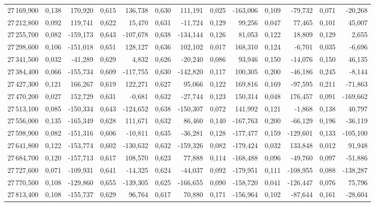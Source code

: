 \begin{longtable}{rrrrrrrrrrrrr}
27\,169,900 & 0,138 & 170,920 & 0,615 & 136,738 & 0,630 & 111,191 & 0,025 & -163,006 & 0,109 & -79,732 & 0,071 & -20,268\\
27\,212,800 & 0,092 & 119,741 & 0,622 & 15,470 & 0,631 & -11,724 & 0,129 & 99,256 & 0,047 & 77,465 & 0,101 & 45,007\\
27\,255,700 & 0,082 & -159,173 & 0,643 & -107,678 & 0,638 & -134,144 & 0,126 & 81,053 & 0,122 & 18,809 & 0,129 & 2,655\\
27\,298,600 & 0,106 & -151,018 & 0,651 & 128,127 & 0,636 & 102,102 & 0,017 & 168,310 & 0,124 & -6,701 & 0,035 & -6,696\\
27\,341,500 & 0,032 & -41,289 & 0,629 & 4,832 & 0,626 & -20,240 & 0,086 & 93,946 & 0,150 & -14,076 & 0,150 & 46,135\\
27\,384,400 & 0,066 & -155,734 & 0,609 & -117,755 & 0,630 & -142,820 & 0,117 & 100,305 & 0,200 & -46,186 & 0,245 & -8,144\\
27\,427,300 & 0,121 & 166,267 & 0,619 & 122,271 & 0,627 & 95,066 & 0,122 & 169,816 & 0,169 & -97,595 & 0,211 & -71,863\\
27\,470,200 & 0,027 & 152,729 & 0,631 & -0,681 & 0,632 & -27,744 & 0,123 & 150,314 & 0,048 & 176,457 & 0,091 & -169,662\\
27\,513,100 & 0,085 & -150,334 & 0,643 & -124,652 & 0,638 & -150,307 & 0,072 & 141,992 & 0,121 & -1,868 & 0,138 & 40,797\\
27\,556,000 & 0,135 & -165,349 & 0,628 & 111,671 & 0,632 & 86,460 & 0,140 & -167,763 & 0,200 & -66,129 & 0,196 & -36,119\\
27\,598,900 & 0,082 & -151,316 & 0,606 & -10,811 & 0,635 & -36,281 & 0,128 & -177,477 & 0,159 & -129,601 & 0,133 & -105,100\\
27\,641,800 & 0,122 & -153,774 & 0,602 & -130,632 & 0,632 & -159,326 & 0,082 & -179,424 & 0,032 & 133,848 & 0,012 & 91,948\\
27\,684,700 & 0,120 & -157,713 & 0,617 & 108,570 & 0,623 & 77,888 & 0,114 & -168,488 & 0,096 & -49,760 & 0,097 & -51,886\\
27\,727,600 & 0,071 & -109,931 & 0,641 & -14,325 & 0,624 & -44,037 & 0,092 & -179,951 & 0,111 & -108,955 & 0,088 & -138,287\\
27\,770,500 & 0,108 & -129,860 & 0,655 & -139,305 & 0,625 & -166,655 & 0,090 & -158,720 & 0,041 & -126,447 & 0,076 & 75,796\\
27\,813,400 & 0,108 & -155,737 & 0,629 & 96,764 & 0,617 & 70,880 & 0,171 & -156,964 & 0,102 & -87,644 & 0,161 & -28,604\\

\end{longtable}
